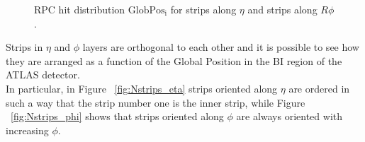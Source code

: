 \begin{figure}[!h]
	\centering	
	\caption{RPC hit distribution $\mathrm{GlobPos_{i}}$ for  strips along $\eta$ and  strips along $R\phi$.}
	\label{fig:strips}
\end{figure}	
\newpage\phantom{}
\noindent Strips in $\eta$ and $\phi$ layers are orthogonal to each other and it is possible to see how they are arranged as a function of the Global Position in the BI region of the ATLAS detector.\\
In particular, in Figure ~\ref{fig:Nstrips_eta} strips oriented along $\eta$ are ordered in such a 
way that the strip number one is the inner strip, while Figure ~\ref{fig:Nstrips_phi} shows that 
strips oriented along $\phi$ are always oriented with increasing $\phi$. 
